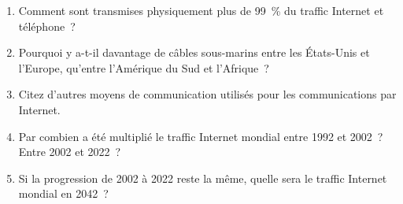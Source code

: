 \documentclass[11pt]{article}
\begin{document}
\begin{enumerate}
  \item Comment sont transmises physiquement plus de 99~\% du traffic Internet et téléphone ?
  \item Pourquoi y a-t-il davantage de câbles sous-marins entre les États-Unis et l'Europe, qu'entre l'Amérique du Sud et l'Afrique ?
  \item Citez d'autres moyens de communication utilisés pour les communications par Internet.
  \item Par combien a été multiplié le traffic Internet mondial entre 1992 et 2002 ? Entre 2002 et 2022 ?
  \item Si la progression de 2002 à 2022 reste la même, quelle sera le traffic Internet mondial en 2042 ?
\end{enumerate}
\end{document}
